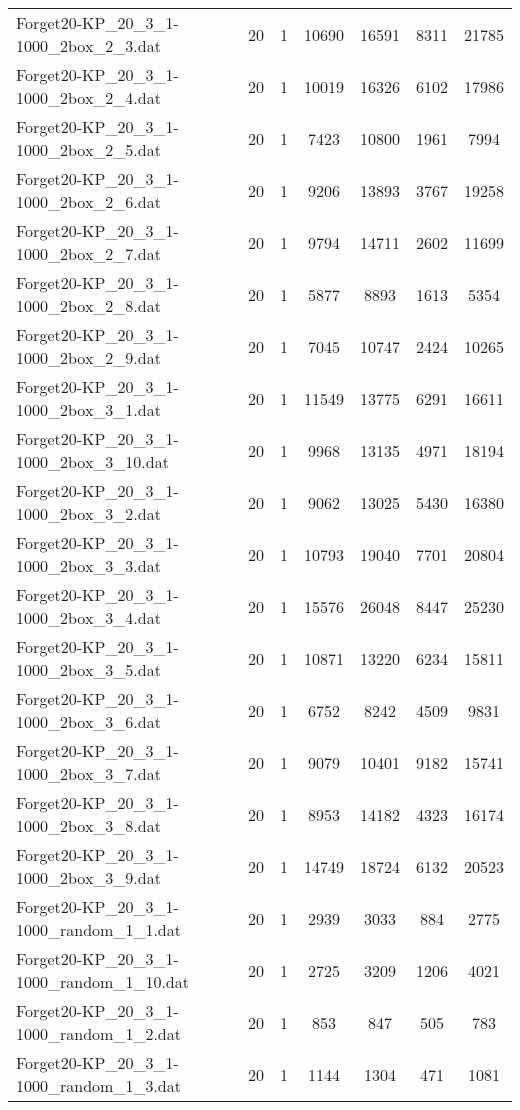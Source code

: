 \begin{table}[!ht]
\begin{tabular}{lcccccc}
Forget20-KP\_20\_3\_1-1000\_2box\_2\_3.dat & 20 & 1 & 10690 & 16591 & 8311 & 21785 \\
Forget20-KP\_20\_3\_1-1000\_2box\_2\_4.dat & 20 & 1 & 10019 & 16326 & 6102 & 17986 \\
Forget20-KP\_20\_3\_1-1000\_2box\_2\_5.dat & 20 & 1 & 7423 & 10800 & 1961 & 7994 \\
Forget20-KP\_20\_3\_1-1000\_2box\_2\_6.dat & 20 & 1 & 9206 & 13893 & 3767 & 19258 \\
Forget20-KP\_20\_3\_1-1000\_2box\_2\_7.dat & 20 & 1 & 9794 & 14711 & 2602 & 11699 \\
Forget20-KP\_20\_3\_1-1000\_2box\_2\_8.dat & 20 & 1 & 5877 & 8893 & 1613 & 5354 \\
Forget20-KP\_20\_3\_1-1000\_2box\_2\_9.dat & 20 & 1 & 7045 & 10747 & 2424 & 10265 \\
Forget20-KP\_20\_3\_1-1000\_2box\_3\_1.dat & 20 & 1 & 11549 & 13775 & 6291 & 16611 \\
Forget20-KP\_20\_3\_1-1000\_2box\_3\_10.dat & 20 & 1 & 9968 & 13135 & 4971 & 18194 \\
Forget20-KP\_20\_3\_1-1000\_2box\_3\_2.dat & 20 & 1 & 9062 & 13025 & 5430 & 16380 \\
Forget20-KP\_20\_3\_1-1000\_2box\_3\_3.dat & 20 & 1 & 10793 & 19040 & 7701 & 20804 \\
Forget20-KP\_20\_3\_1-1000\_2box\_3\_4.dat & 20 & 1 & 15576 & 26048 & 8447 & 25230 \\
Forget20-KP\_20\_3\_1-1000\_2box\_3\_5.dat & 20 & 1 & 10871 & 13220 & 6234 & 15811 \\
Forget20-KP\_20\_3\_1-1000\_2box\_3\_6.dat & 20 & 1 & 6752 & 8242 & 4509 & 9831 \\
Forget20-KP\_20\_3\_1-1000\_2box\_3\_7.dat & 20 & 1 & 9079 & 10401 & 9182 & 15741 \\
Forget20-KP\_20\_3\_1-1000\_2box\_3\_8.dat & 20 & 1 & 8953 & 14182 & 4323 & 16174 \\
Forget20-KP\_20\_3\_1-1000\_2box\_3\_9.dat & 20 & 1 & 14749 & 18724 & 6132 & 20523 \\
Forget20-KP\_20\_3\_1-1000\_random\_1\_1.dat & 20 & 1 & 2939 & 3033 & 884 & 2775 \\
Forget20-KP\_20\_3\_1-1000\_random\_1\_10.dat & 20 & 1 & 2725 & 3209 & 1206 & 4021 \\
Forget20-KP\_20\_3\_1-1000\_random\_1\_2.dat & 20 & 1 & 853 & 847 & 505 & 783 \\
Forget20-KP\_20\_3\_1-1000\_random\_1\_3.dat & 20 & 1 & 1144 & 1304 & 471 & 1081 \\

\end{tabular}
\end{table}
